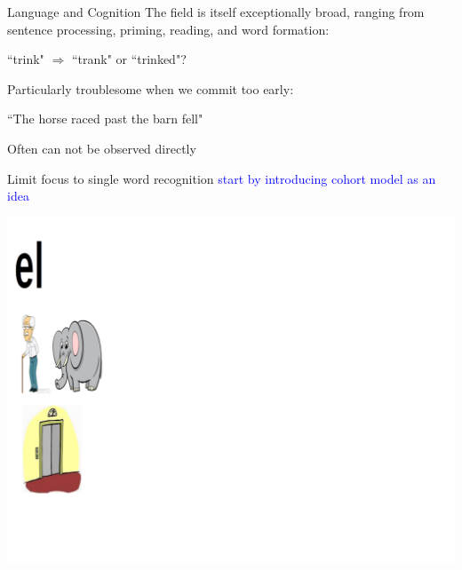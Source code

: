 \documentclass{beamer}
\newcommand{\vp}{\vspace{2mm}}
\providecommand{\cn}[1]{\textcolor{blue}{#1}}
\begin{document}
\begin{frame}{Language and Cognition}\large
The field is itself exceptionally broad, ranging from sentence processing, priming, reading, and word formation:

\begin{center}
``trink" $\Rightarrow$ ``trank" or ``trinked"? \vp
\end{center}

Particularly troublesome when we commit too early:

\begin{center}
``The horse raced past the barn fell"  \vp
\end{center}

Often can not be observed directly  \vp

Limit focus to single word recognition \cn{start by introducing cohort model as an idea}



\end{frame}


\begin{frame}
\begin{center}
\includegraphics[scale=0.3]{img/ele_1.png}
\end{center}
\end{frame}
\end{document}
